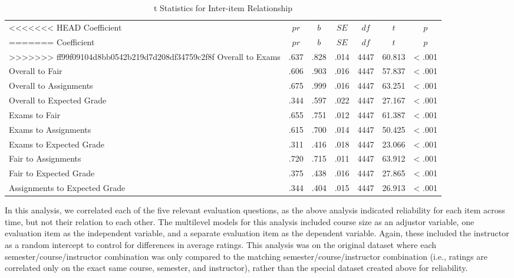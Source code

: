 \documentclass[,man]{apa6}
\theoremstyle{definition}
\theoremstyle{definition}
\theoremstyle{definition}
\theoremstyle{remark}
\begin{document}
\begin{table}[tbp]
\begin{center}
\begin{threeparttable}
\caption{\label{tab:correlation-table}t Statistics for Inter-item Relationship}
\begin{tabular}{lcccccc}
\toprule
<<<<<<< HEAD
Coefficient & \multicolumn{1}{c}{$pr$} & \multicolumn{1}{c}{$b$} & \multicolumn{1}{c}{$SE$} & \multicolumn{1}{c}{$df$} & \multicolumn{1}{c}{$t$} & \multicolumn{1}{c}{$p$}\\
=======
Coefficient & $pr$ & $b$ & $SE$ & $df$ & $t$ & $p$\\
>>>>>>> ff99f09104d8bb0542b219d7d208df34759c2f8f
\midrule
Overall to Exams & .637 & .828 & .014 & 4447 & 60.813 & < .001\\
Overall to Fair & .606 & .903 & .016 & 4447 & 57.837 & < .001\\
Overall to Assignments & .675 & .999 & .016 & 4447 & 63.251 & < .001\\
Overall to Expected Grade & .344 & .597 & .022 & 4447 & 27.167 & < .001\\
Exams to Fair & .655 & .751 & .012 & 4447 & 61.387 & < .001\\
Exams to Assignments & .615 & .700 & .014 & 4447 & 50.425 & < .001\\
Exams to Expected Grade & .311 & .416 & .018 & 4447 & 23.066 & < .001\\
Fair to Assignments & .720 & .715 & .011 & 4447 & 63.912 & < .001\\
Fair to Expected Grade & .375 & .438 & .016 & 4447 & 27.865 & < .001\\
Assignments to Expected Grade & .344 & .404 & .015 & 4447 & 26.913 & < .001\\
\bottomrule
\end{tabular}
\end{threeparttable}
\end{center}
\end{table}

In this analysis, we correlated each of the five relevant evaluation
questions, as the above analysis indicated reliability for each item
across time, but not their relation to each other. The multilevel models
for this analysis included course size as an adjustor variable, one
evaluation item as the independent variable, and a separate evaluation
item as the dependent variable. Again, these included the instructor as
a random intercept to control for differences in average ratings. This
analysis was on the original dataset where each
semester/course/instructor combination was only compared to the matching
semester/course/instructor combination (i.e., ratings are correlated
only on the exact same course, semester, and instructor), rather than
the special dataset created above for reliability.
\end{document}
